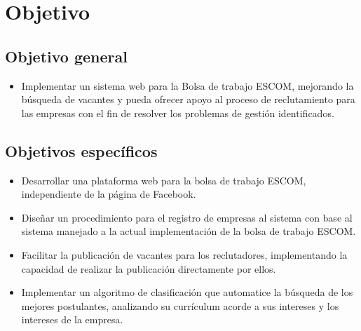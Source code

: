 \section{Objetivo}
\subsection{Objetivo general}
\begin{itemize}
    \item Implementar un sistema web para la Bolsa de trabajo ESCOM, mejorando la búsqueda de vacantes y pueda 
    ofrecer apoyo al proceso de reclutamiento para las empresas con el fin de resolver los problemas de gestión 
    identificados.
\end{itemize}

\subsection{Objetivos específicos}
        \begin{itemize}
            \item Desarrollar una plataforma web para la bolsa de trabajo ESCOM, independiente de la página de Facebook.
            \item Diseñar un procedimiento para el registro de empresas al sistema con base al sistema manejado a la actual 
            implementación de la bolsa de trabajo ESCOM.
            \item Facilitar la publicación de vacantes para los reclutadores, implementando la capacidad de realizar la
            publicación directamente por ellos.
            \item Implementar un algoritmo de clasificación que automatice la búsqueda de los mejores postulantes, analizando su 
            currículum acorde a sus intereses y los intereses de la empresa.
        \end{itemize}





